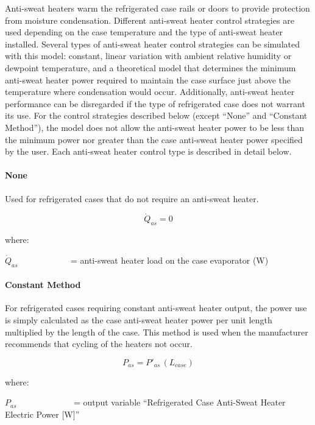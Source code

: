 Anti-sweat heaters warm the refrigerated case rails or doors to provide protection from moisture condensation. Different anti-sweat heater control strategies are used depending on the case temperature and the type of anti-sweat heater installed. Several types of anti-sweat heater control strategies can be simulated with this model: constant, linear variation with ambient relative humidity or dewpoint temperature, and a theoretical model that determines the minimum anti-sweat heater power required to maintain the case surface just above the temperature where condensation would occur. Additionally, anti-sweat heater performance can be disregarded if the type of refrigerated case does not warrant its use. For the control strategies described below (except ``None'' and ``Constant Method''), the model does not allow the anti-sweat heater power to be less than the minimum power nor greater than the case anti-sweat heater power specified by the user. Each anti-sweat heater control type is described in detail below.

\paragraph{None}\label{none}

Used for refrigerated cases that do not require an anti-sweat heater.

\begin{equation}
{\dot Q_{as}} = 0
\end{equation}

where:

\({\dot Q_{as}}\) ~~~~~~~~~~~ = anti-sweat heater load on the case evaporator (W)

\paragraph{Constant Method}\label{constant-method}

For refrigerated cases requiring constant anti-sweat heater output, the power use is simply calculated as the case anti-sweat heater power per unit length multiplied by the length of the case. This method is used when the manufacturer recommends that cycling of the heaters not occur.

\begin{equation}
{P_{as}} = {P'}_{as}\,\left( {{L_{case}}} \right)
\end{equation}

where:

\({P_{as}}\) ~~~~~~~~~~~~ = output variable ``Refrigerated Case Anti-Sweat Heater Electric Power {[}W{]}''

